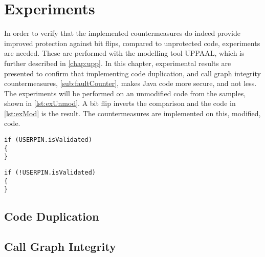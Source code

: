 \chapter{Experiments}
In order to verify that the implemented countermeasures do indeed provide improved protection against bit flips, compared to unprotected code, experiments are needed. These are performed with the modelling tool UPPAAL, which is further described in \cref{chap:upp}. In this chapter, experimental results are presented to confirm that implementing code duplication, and call graph integrity countermeasures, \cref{sub:faultCounter}, makes Java code more secure, and not less. The experiments will be performed on an unmodified code from the \jc samples, shown in \cref{lst:exUnmod}. A bit flip inverts the comparison and the code in \cref{lst:exMod} is the result. The countermeasures are implemented on this, modified, code.
\begin{lstlisting}[label={lst:exUnmod}, caption=Purse code sample from the \jc samples.]
if (USERPIN.isValidated)
{
}
\end{lstlisting}

\begin{lstlisting}[label={lst:exMod}, caption=Purse code sample from the \jc samples with a bit flipped to change the comparison.]
if (!USERPIN.isValidated)
{
}
\end{lstlisting}
\section{Code Duplication}

\section{Call Graph Integrity}
